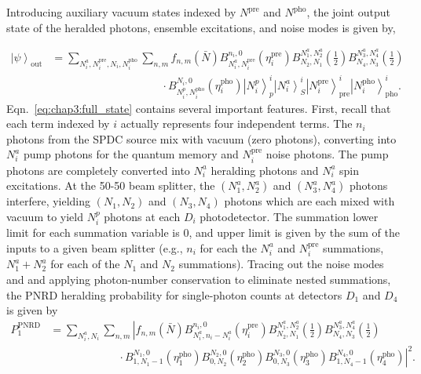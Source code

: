 \documentclass[aps,twocolumn,secnumarabic,amsmath,amssymb,pra,groupedaddress,
showpacs, showkeys,draft]{revtex4-1}
\newcommand{\ket}[1]{\left|#1\right\rangle}
\newcommand{\pna}[1]{\left(#1\right)}
\begin{document}
Introducing auxiliary vacuum states indexed by $N^{\textrm{pre}}$ and
$N^{\textrm{pho}}$, the joint output state of the heralded photons, ensemble
excitations, and noise modes is given by,
\begin{widetext}
\begin{align}
	\ket{\psi}_{\textrm{out}} &=\sum_{N_i^a,N_i^{\textrm{pre}},N_i,N_i^{\textrm{pho}}}
	\sum_{n,m} 
	f_{n,m}\pna{\bar{N}}
	B_{N_i^a,N_i^{\textrm{pre}}}^{n_i,0}\pna{\eta_i^{\textrm{pre}}}  
	B_{N_2,N_1}^{N_1^a,N_2^a}\pna{\frac{1}{2}}  
	B_{N_4,N_3}^{N_3^a,N_4^a}\pna{\frac{1}{2}}\nonumber \\
	& \qquad \qquad \qquad \qquad \qquad
	\cdot B_{N_i^p,N_i^{\textrm{pho}}}^{N_i,0}\pna{\eta_i^{\textrm{pho}}}  
	\ket{N_i^p}^i_p
	\ket{N_i^a}^i_S 
	\ket{N_i^{\textrm{pre}}}^i_{\textrm{pre}}
	\ket{N_i^{\textrm{pho}}}^i_{\textrm{pho}}. \label{eq:chap3:full_state}
\end{align}
Eqn.~\ref{eq:chap3:full_state} contains several important features. First,
recall that each term indexed by $i$ actually represents four independent
terms. The $n_i$ photons from the SPDC source mix with vacuum (zero photons),
converting into $N^a_i$ pump photons for the quantum memory and
$N_i^{\textrm{pre}}$ noise photons. The pump photons are completely converted
into $N^a_i$ heralding photons and $N^a_i$ spin excitations. At the 50-50 beam
splitter, the $\pna{N^a_1,N^a_2}$ and $\pna{N^a_3,N^a_4}$ photons interfere,
yielding $\pna{N_1,N_2}$ and $\pna{N_3,N_4}$ photons which are each mixed with
vacuum to yield $N^p_i$ photons at each $D_i$ photodetector. The summation
lower limit for each summation variable is 0, and upper limit is given by the
sum of the inputs to a given beam splitter (e.g., $n_i$ for each the $N^a_i$
and $N_i^{\textrm{pre}}$ summations, $N^a_1+N^a_2$ for each of the $N_1$ and
$N_2$ summations). Tracing out the noise modes and and applying photon-number
conservation to eliminate nested summations, the PNRD heralding probability for
single-photon counts at detectors $D_1$ and $D_4$ is given by
\begin{align}
	P_{1}^{\textrm{PNRD}}&=\sum_{N_i^a,N_i}\sum_{n,m}
	\left| f_{n,m}\pna{\bar{N}}
	B_{N_i^a,n_i-N_i^a}^{n_i,0}\pna{\eta_i^{\textrm{pre}}}
	B_{N_2,N_1}^{N_1^a,N_2^a}\pna{\frac{1}{2}}  
	B_{N_4,N_3}^{N_3^a,N_4^a}\pna{\frac{1}{2}} \right. \nonumber \\
	& \qquad \qquad \qquad\left.~\cdot B_{1,N_1-1}^{N_1,0}\pna{\eta_1^{\textrm{pho}}} 
	B_{0,N_2}^{N_2,0}\pna{\eta_2^{\textrm{pho}}} 
	B_{0,N_3}^{N_3,0}\pna{\eta_3^{\textrm{pho}}} 
	B_{1,N_4-1}^{N_4,0}\pna{\eta_4^{\textrm{pho}}} \right|^2. 

\end{align}
\end{widetext}
\end{document}
